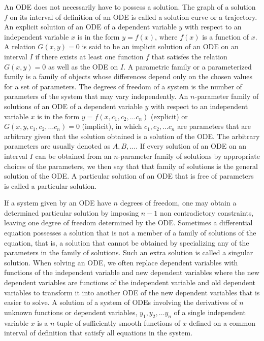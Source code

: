 \documentclass[a4paper,12pt]{report}
\begin{document}
An ODE does not necessarily have to possess a solution.
The graph of a solution $f$ on its interval of definition of an ODE is called a solution curve or a trajectory.
An explicit solution of an ODE of a dependent variable $y$ with respect to an independent variable $x$ is in the form $y=f(x)$, where $f(x)$ is a function of $x$.
A relation $G(x, y) = 0$ is said to be an implicit solution of an ODE on an interval $I$ if there exists at least one function $f$ that satisfes the relation $G(x, y) = 0$ as well as the ODE on $I$.
A parametric family or a parameterized family is a family of objects whose differences depend only on the chosen values for a set of parameters.
The degrees of freedom of a system is the number of parameters of the system that may vary independently.
An $n$-parameter family of solutions of an ODE of a dependent variable $y$ with respect to an independent variable $x$ is in the form $y=f(x,c_1,c_2,\dots c_n)$ (explicit) or $G(x,y,c_1,c_2,\dots c_n)=0$ (implicit), in which $c_1,c_2,\dots c_n$ are parameters that are arbitrary given that the solution obtained is a solution of the ODE. The arbitrary parameters are usually denoted as $A,B,\ldots$.
If every solution of an ODE on an interval $I$ can be obtained from an $n$-parameter family of solutions by appropriate choices of the parameters, we then say that that family of solutions is the general solution of the ODE.
A particular solution of an ODE that is free of parameters is called a particular solution.

If a system given by an ODE have $n$ degrees of freedom, one may obtain a determined particular solution by imposing $n-1$ non contradictory constraints, leaving one degree of freedom determined by the ODE.
Sometimes a differential equation possesses a solution that is not a member of a family of solutions of the equation, that is, a solution that cannot be obtained by specializing any of the parameters in the family of solutions. Such an extra solution is called a singular solution.
When solving an ODE, we often replace dependent variables with functions of the independent variable and new dependent variables where the new dependent variables are functions of the independent variable and old dependent variables to transform it into another ODE of the new dependent variables that is easier to solve.
A solution of a system of ODEs involving the derivatives of $n$ unknown functions or dependent variables, $y_1,y_2,\dots y_n$ of a single independent variable $x$ is a $n$-tuple of sufficiently smooth functions of $x$ defined on a common interval of definition that satisfy all equations in the system.
\end{document}
